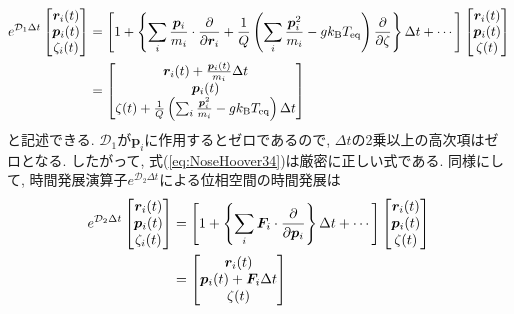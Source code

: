 \begin{align}
 e^{\mathcal{D}_{1} \Delta t}
 \begin{bmatrix}
  \bm{r}_{i} (t) \\
  \bm{p}_{i} (t) \\
  \zeta_{i} (t) \\
 \end{bmatrix}
 &= \left[
    1 + \left\{
    \sum_{i} \frac{\bm{p}_{i}}{m_{i}} \cdot \frac{\partial}{\partial \bm{r}_{i}}
    +
    \frac{1}{Q}
    \left( \sum_{i} \frac{\bm{p}^{2}_{i}}{m_{i}} - g k_{\mathrm{B}} T_{\mathrm{eq}} \right)
    \frac{\partial}{\partial \zeta}
    \right\} \Delta t
    + \cdots
 \right]
 \begin{bmatrix}
  \bm{r}_{i} (t) \\
  \bm{p}_{i} (t) \\
  \zeta (t) \\
 \end{bmatrix}
 \notag \\
 &=
 \begin{bmatrix}
  \bm{r}_{i} (t) + \frac{\bm{p}_{i}(t)}{m_{i}} \Delta t \\
  \bm{p}_{i} (t)                                            \\
  \zeta (t) + \frac{1}{Q}
  \left( \sum_{i} \frac{\bm{p}^{2}_{i}}{m_{i}} - g k_{\mathrm{B}} T_{\mathrm{eq}} \right)
  \Delta t
 \end{bmatrix}
 \label{eq:NoseHoover34}
\end{align}
と記述できる.
$\mathcal{D}_{1}$が$\bm{p}_{i}$に作用するとゼロであるので, $\Delta t$の2乗以上の高次項はゼロとなる.
したがって, 式(\ref{eq:NoseHoover34})は厳密に正しい式である.
同様にして, 時間発展演算子$e^{\mathcal{D}_{2} \Delta t}$による位相空間の時間発展は
\begin{align}
 e^{\mathcal{D}_{2} \Delta t}
 \begin{bmatrix}
  \bm{r}_{i} (t) \\
  \bm{p}_{i} (t) \\
  \zeta_{i} (t) \\
 \end{bmatrix}
 &= \left[
    1 + \left\{
    \sum_{i} \bm{F}_{i} \cdot \frac{\partial}{\partial \bm{p}_{i}}
    \right\} \Delta t
    + \cdots
 \right]
 \begin{bmatrix}
  \bm{r}_{i} (t) \\
  \bm{p}_{i} (t) \\
  \zeta (t) \\
 \end{bmatrix}
 \notag \\
 &=
 \begin{bmatrix}
  \bm{r}_{i} (t) \\
  \bm{p}_{i} (t) + \bm{F}_{i} \Delta t \\
  \zeta (t)
 \end{bmatrix}
 \label{eq:NoseHoover35}
\end{align}
